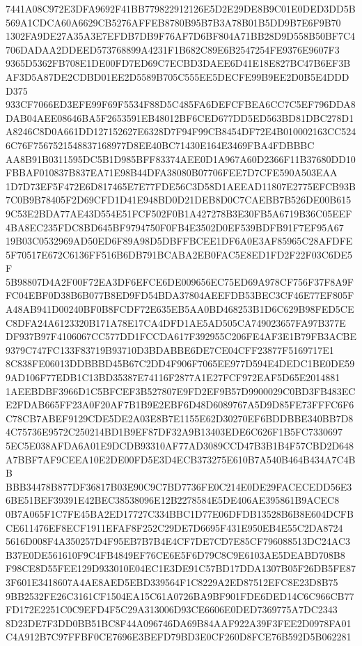 \documentclass[UTF8,fontset=fandol,zihao=-4,a4paper]{ctexart}
\begin{document}
{{7441A08C972E3DFA9692F41BB779822912126E5D2E29DE8B9C01E0DED3DD5B569A1CDCA60A6629CB5276AFFEB8780B95B7B3A78B01B5DD9B7E6F9B70
1302FA9DE27A35A3E7EFDB7DB9F76AF7D6BF804A71BB28D9D558B50BF7C4706DADAA2DDEED573768899A4231F1B682C89E6B2547254FE9376E9607F3
9365D5362FB708E1DE00FD7ED69C7ECBD3DAEE6D41E18E827BC47B6EF3BAF3D5A87DE2CDBD01EE2D5589B705C555EE5DECFE99B9EE2D0B5E4DDDD375
933CF7066ED3EFE99F69F5534F88D5C485FA6DEFCFBEA6CC7C5EF796DDA8DAB04AEE08646BA5F2653591EB48012BF6CED677DD5ED563BD81DBC278D1
A8246C8D0A661DD127152627E6328D7F94F99CB8454DF72E4B010002163CC5246C76F7567521548837168977D8EE40BC71430E164E3469FBA4FDBBBC
AA8B91B0311595DC5B1D985BFF83374AEE0D1A967A60D2366F11B37680DD10FBBAF010837B837EA71E98B44DFA38080B07706FEE7D7CFE590A503EAA
1D7D73EF5F472E6D817465E7E77FDE56C3D58D1AEEAD11807E2775EFCB93B7C0B9B78405F2D69CFD1D41E948BD0D21DEB8D0C7CAEBB7B526DE00B615
9C53E2BDA77AE43D554E51FCF502F0B1A427278B3E30FB5A6719B36C05EEF4BA8EC235FDC8BD645BF9794750F0FB4E3502D0EF539BDFB91F7EF95A67
19B03C0532969AD50ED6F89A98D5DBFFBCEE1DF6A0E3AF85965C28AFDFE5F70517E672C6136FF516B6DB791BCABA2EB0FAC5E8ED1FD2F22F03C6DE5F
5B98807D4A2F00F72EA3DF6EFCE6DE009656EC75ED69A978CF756F37F8A9FFC04EBF0D38B6B077B8ED9FD54BDA37804AEEFDB53BEC3CF46E77EF805F
A48AB941D00240BF0B8FCDF72E635EB5AA0BD468253B1D6C629B98FED5CEC8DFA24A6123320B171A78E17CA4DFD1AE5AD505CA749023657FA97B377E
DF937B97F4106067CC577DD1FCCDA617F392955C206FE4AF3E1B79FB3ACBE9379C747FC133F83719B93710D3BDABBE6DE7CE04CFF23877F5169717E1
8C838FE06013DDBBBD45B67C2DD4F906F7065EE977D594E4DEDC1BE0DE599AD106F77EDB1C13BD35387E74116F2877A1E27FCF972EAF5D65E2014881
1AEEBDBF3966D1C5BFCEF3B527807E9FD2EF9B57D9900029C0BD3FB483ECE2FDAB665FF23A0F20AF7B1B9E2EBF6D48D6089767A5D9D85FE73FFFC6F6
C78CB7ABEF9129CDE5DE2A03E8B7E1155E62D30270EF6BDDBBE340BB7D84C75736E9572C250214BD1B9EF87DF32A9B13403EDE6C626F1B5FC7330697
5EC5E038AFDA6A01E9DCDB93310AF77AD3089CCD47B3B1B4F57CBD2D648A7BBF7AF9CEEA10E2DE00FD5E3D4ECB373275E610B7A540B464B434A7C4BB
BBB34478B877DF36817B03E90C9C7BD7736FE0C214E0DE29FACECEDD56E36BE51BEF39391E42BEC38538096E12B2278584E5DE406AE395861B9ACEC8
0B7A065F1C7FE45BA2ED17727C334BBC1D77E06DFDB13528B6B8E604DCFBCE611476EF8ECF1911EFAF8F252C29DE7D6695F431E950EB4E55C2DA8724
5616D008F4A350257D4F95EB7B7B4E4CF7DE7CD7E85CF796088513DC24AC3B37E0DE561610F9C4FB4849EF76CE6E5F6D79C8C9E6103AE5DEABD708B8
F98CE8D55FEE129D933010E04EC1E3DE91C57BD17DDA1307B05F26DB5FE873F601E3418607A4AE8AED5EBD339564F1C8229A2ED87512EFC8E23D8B75
9BB2532FE26C3161CF1504EA15C61A0726BA9BF901FDE6DED14C6C966CB77FD172E2251C0C9EFD4F5C29A313006D93CE6606E0DED7369775A7DC2343
8D23DE7F3DD0BB51BC8F44A096746DA69B84AAF922A39F3FEE2D0978FA01C4A912B7C97FFBF0CE7696E3BEFD79BD3E0CF260D8FCE76B592D5B062281
}}
\end{document}
